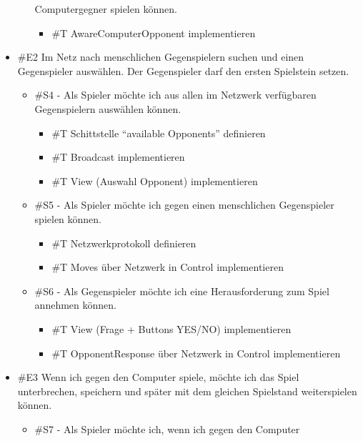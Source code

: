 \documentclass[a4paper, 10pt, fleqn]{article}
\begin{document}
\begin{itemize}
\begin{itemize}
            Computergegner spielen können. 
        \begin{itemize}
            \item \#T AwareComputerOpponent implementieren 
        \end{itemize}
    \end{itemize}
    \item \#E2 Im Netz nach menschlichen Gegenspielern suchen und einen 
        Gegenspieler auswählen. Der Gegenspieler darf den ersten Spielstein 
        setzen.
    \begin{itemize}
        \item \#S4 - Als Spieler möchte ich aus allen im Netzwerk verfügbaren 
            Gegenspielern auswählen können. 
        \begin{itemize}
            \item \#T Schittstelle “available Opponents” definieren
            \item \#T Broadcast implementieren
            \item \#T View (Auswahl Opponent) implementieren
        \end{itemize}
        \item \#S5 - Als Spieler möchte ich gegen einen menschlichen 
            Gegenspieler spielen können.
        \begin{itemize}
            \item \#T Netzwerkprotokoll definieren
            \item \#T Moves über Netzwerk in Control implementieren
        \end{itemize}
        \item \#S6 - Als Gegenspieler möchte ich eine Herausforderung zum 
            Spiel annehmen können.
        \begin{itemize}
            \item \#T View (Frage + Buttons YES/NO) implementieren
            \item \#T OpponentResponse über Netzwerk in Control implementieren
        \end{itemize}
    \end{itemize}
    \item \#E3 Wenn ich gegen den Computer spiele, möchte ich das Spiel 
        unterbrechen, speichern und später mit dem gleichen Spielstand 
        weiterspielen können.
    \begin{itemize}
        \item \#S7 - Als Spieler möchte ich, wenn ich gegen den Computer 

\end{itemize}
\end{itemize}
\end{document}
